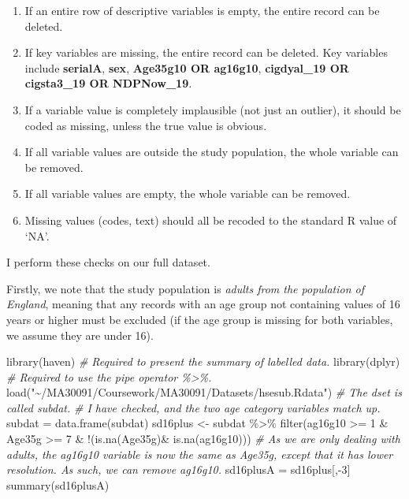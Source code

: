 \documentclass[
  11pt,
]{article}
\newenvironment{Shaded}{\begin{snugshade}}{\end{snugshade}}
\newcommand{\CommentTok}[1]{\textcolor[rgb]{0.56,0.35,0.01}{\textit{#1}}}
\newcommand{\DecValTok}[1]{\textcolor[rgb]{0.00,0.00,0.81}{#1}}
\newcommand{\FunctionTok}[1]{\textcolor[rgb]{0.00,0.00,0.00}{#1}}
\newcommand{\NormalTok}[1]{#1}
\newcommand{\OtherTok}[1]{\textcolor[rgb]{0.56,0.35,0.01}{#1}}
\newcommand{\SpecialCharTok}[1]{\textcolor[rgb]{0.00,0.00,0.00}{#1}}
\newcommand{\StringTok}[1]{\textcolor[rgb]{0.31,0.60,0.02}{#1}}
\providecommand{\tightlist}{%
  \setlength{\itemsep}{0pt}\setlength{\parskip}{0pt}}
\begin{document}
\begin{enumerate}
\def\labelenumi{\arabic{enumi}.}
\tightlist
\item
  If an entire row of descriptive variables is empty, the entire record
  can be deleted.
\item
  If key variables are missing, the entire record can be deleted. Key
  variables include \textbf{serialA}, \textbf{sex}, \textbf{Age35g10 OR
  ag16g10}, \textbf{cigdyal\_19 OR cigsta3\_19 OR NDPNow\_19}.
\item
  If a variable value is completely implausible (not just an outlier),
  it should be coded as missing, unless the true value is obvious.
\item
  If all variable values are outside the study population, the whole
  variable can be removed.
\item
  If all variable values are empty, the whole variable can be removed.
\item
  Missing values (codes, text) should all be recoded to the standard R
  value of `NA'.
\end{enumerate}

I perform these checks on our full dataset.

Firstly, we note that the study population is \emph{adults from the
population of England}, meaning that any records with an age group not
containing values of 16 years or higher must be excluded (if the age
group is missing for both variables, we assume they are under 16).

\begin{Shaded}
\begin{Highlighting}[]
\FunctionTok{library}\NormalTok{(haven) }\CommentTok{\# Required to present the summary of labelled data.}
\FunctionTok{library}\NormalTok{(dplyr) }\CommentTok{\# Required to use the pipe operator \%\textgreater{}\%.}
\FunctionTok{load}\NormalTok{(}\StringTok{"\textasciitilde{}/MA30091/Coursework/MA30091/Datasets/hsesub.Rdata"}\NormalTok{) }\CommentTok{\# The dset is called subdat.}
\CommentTok{\# I have checked, and the two age category variables match up.}
\NormalTok{subdat }\OtherTok{=} \FunctionTok{data.frame}\NormalTok{(subdat)}
\NormalTok{sd16plus }\OtherTok{\textless{}{-}}\NormalTok{ subdat }\SpecialCharTok{\%\textgreater{}\%}
  \FunctionTok{filter}\NormalTok{(ag16g10 }\SpecialCharTok{\textgreater{}=} \DecValTok{1} \SpecialCharTok{\&}\NormalTok{ Age35g }\SpecialCharTok{\textgreater{}=} \DecValTok{7} \SpecialCharTok{\&} \SpecialCharTok{!}\NormalTok{(}\FunctionTok{is.na}\NormalTok{(Age35g)}\SpecialCharTok{\&} \FunctionTok{is.na}\NormalTok{(ag16g10)))}
\CommentTok{\# As we are only dealing with adults, the ag16g10 variable is now the same as Age35g, except that it has lower resolution. As such, we can remove ag16g10.}
\NormalTok{sd16plusA }\OtherTok{=}\NormalTok{ sd16plus[,}\SpecialCharTok{{-}}\DecValTok{3}\NormalTok{]}
\FunctionTok{summary}\NormalTok{(sd16plusA)}
\end{Highlighting}
\end{Shaded}
\end{document}
